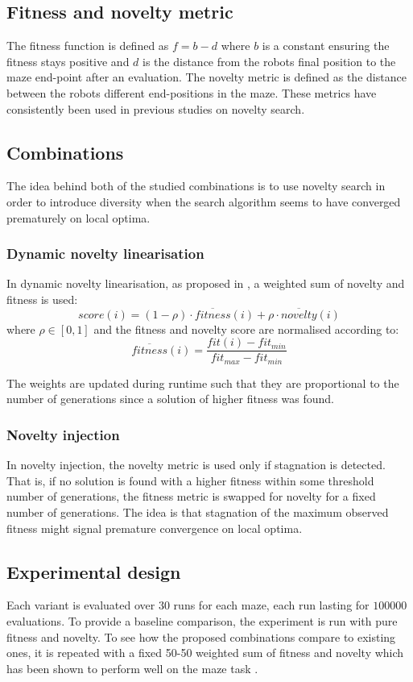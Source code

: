 \subsection{Fitness and novelty metric}
The fitness function is defined as $f = b - d$ where $b$ is a constant ensuring the fitness stays positive
and $d$ is the distance from the robots final position to the maze end-point after an evaluation.
The novelty metric is defined as the distance between the robots different end-positions in the maze.
These metrics have consistently been used in previous studies on novelty search.

\subsection{Combinations}
The idea behind both of the studied combinations is to use novelty search in order to introduce diversity
when the search algorithm seems to have converged prematurely on local optima.

\subsubsection{Dynamic novelty linearisation}
In dynamic novelty linearisation, as proposed in \cite{novelty_not_enough}, a weighted sum of novelty and fitness is used:
\[
    score(i) = (1-\rho) \cdot \overline{fitness}(i) + \rho \cdot \overline{novelty}(i)
\]
where $\rho \in [0,1]$ and the fitness and novelty score are normalised according to:
\[
    \overline{fitness}(i) =  \frac{fit(i) - fit_{min}}{fit_{max} - fit_{min}}
\]


The weights are updated during runtime such that they are proportional to the number of generations since a solution of
higher fitness was found.

\subsubsection{Novelty injection}
In novelty injection, the novelty metric is used only if stagnation is detected. That is, if no solution is found with a
higher fitness within some threshold number of generations, the fitness metric is swapped for novelty for a fixed
number of generations. The idea is that stagnation of the maximum observed fitness might signal
premature convergence on local optima.

\subsection{Experimental design}
Each variant is evaluated over $30$ runs for each maze, each run lasting for $100 000$ evaluations.
To provide a baseline comparison, the experiment is run with pure fitness and novelty. To see how
the proposed combinations compare to existing ones, it is repeated with a fixed 50-50 weighted sum
of fitness and novelty which has been shown to perform well on the maze task \cite{ns_study}.
